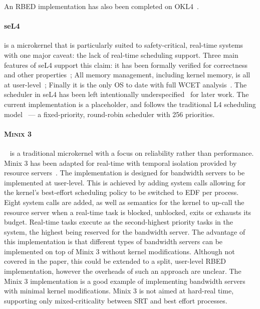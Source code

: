 An \gls{RBED} implementation has also been completed on OKL4~\citep{Petters_LHE_09}.

\paragraph{seL4} is a microkernel that is particularly suited to safety-critical, real-time systems with one major caveat: the lack of real-time scheduling support.
Three main features of seL4 support this claim: it has been formally verified for correctness~\citep{Klein_EHACDEEKNSTW_09} and other properties~\citep{Sewell_WGMAK_11}; All memory management, including kernel memory, is all at user-level~\citep{Elkaduwe_Derrin_06}; Finally it is the only \gls{OS} to date with full \gls{WCET} analysis~\citep{Blackham_SCRH_11}.
The scheduler in seL4 has been left intentionally underspecified~\citep{Petters_EH_12} for later work.
The current implementation is a placeholder, and follows the traditional L4 scheduling model~\citep{Ruocco_06} --- a fixed-priority, round-robin scheduler with 256 priorities.

\paragraph{\textsc{Minix 3}}~\citep{Herder_BGHT_06} is a traditional microkernel with a focus on reliability rather than performance.
{\sc Minix 3} has been adapted for real-time with temporal isolation provided by resource servers~\citep{Mancina_LFHGT_09}.
 The implementation is designed for bandwidth servers to be implemented at user-level. 
This is achieved by adding system calls allowing for the kernel's best-effort scheduling policy to be switched to \gls{EDF} per process. 
Eight system calls are added, as well as semantics for the kernel to up-call the resource server when a real-time task is blocked, unblocked, exits or exhausts its budget.
Real-time tasks execute as the second-highest priority tasks in the system, the highest being reserved for the bandwidth server. 
The advantage of this implementation is that different types of bandwidth servers can be implemented on top of {\sc Minix 3} without kernel modifications.
 Although not covered in the paper, this could be extended to a split, user-level \gls{RBED} implementation, however the overheads of such an approach are unclear. 
The {\sc Minix 3} implementation is a good example of implementing bandwidth servers with minimal kernel modifications.
 {\sc Minix 3} is not aimed at hard-real time, supporting only mixed-criticality between \gls{SRT} and best effort processes.



